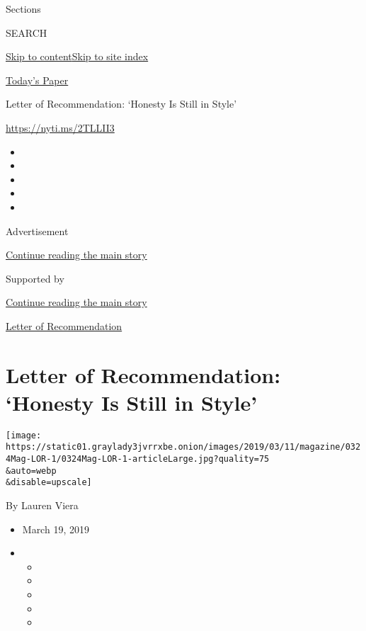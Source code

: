 Sections

SEARCH

\protect\hyperlink{site-content}{Skip to
content}\protect\hyperlink{site-index}{Skip to site index}

\href{https://myaccount.nytimes3xbfgragh.onion/auth/login?response_type=cookie\&client_id=vi}{}

\href{https://www.nytimes3xbfgragh.onion/section/todayspaper}{Today's
Paper}

Letter of Recommendation: `Honesty Is Still in Style'

\url{https://nyti.ms/2TLLII3}

\begin{itemize}
\item
\item
\item
\item
\item
\end{itemize}

Advertisement

\protect\hyperlink{after-top}{Continue reading the main story}

Supported by

\protect\hyperlink{after-sponsor}{Continue reading the main story}

\href{/column/letter-of-recommendation}{Letter of Recommendation}

\hypertarget{letter-of-recommendation-honesty-is-still-in-style}{%
\section{Letter of Recommendation: `Honesty Is Still in
Style'}\label{letter-of-recommendation-honesty-is-still-in-style}}

\texttt{[image: https://static01.graylady3jvrrxbe.onion/images/2019/03/11/magazine/0324Mag-LOR-1/0324Mag-LOR-1-articleLarge.jpg?quality=75\\\&auto=webp\\\&disable=upscale]}

By Lauren Viera

\begin{itemize}
\item
  March 19, 2019
\item
  \begin{itemize}
  \item
  \item
  \item
  \item
  \item
  \end{itemize}
\end{itemize}

